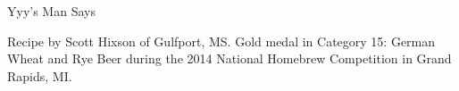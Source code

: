 \begin{recipe}{Yyy's Man Says}

\begin{aboutblock}
Recipe by Scott Hixson of Gulfport, MS. Gold medal in Category 15: German Wheat
and Rye Beer during the 2014 National Homebrew Competition in Grand Rapids, MI.
\sourceaha
\end{aboutblock}


\begin{methodandtiming}

\begin{mashsteps}
\end{mashsteps}

\begin{fermentationsteps}
\end{fermentationsteps}

\end{methodandtiming}

\recipebreak

\begin{ingredientsblock}

\begin{malts}
\end{malts}

\begin{hops}
\end{hops}


\end{ingredientsblock}

\end{recipe}
